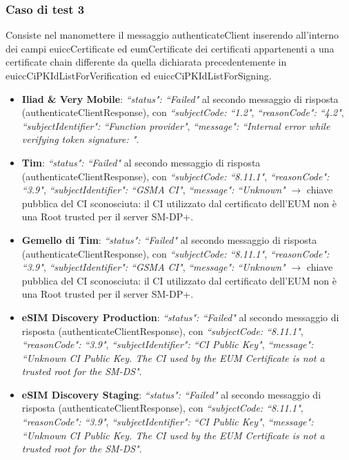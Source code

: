 \documentclass[10pt, oneside]{book}
\begin{document}
\subsubsection{Caso di test 3}
Consiste nel manomettere il messaggio authenticateClient inserendo all'interno dei campi euiccCertificate ed eumCertificate dei certificati appartenenti a una certificate chain differente da quella dichiarata precedentemente in euiccCiPKIdListForVerification ed euiccCiPKIdListForSigning.
\begin{itemize}
\item \textbf{Iliad \& Very Mobile}: \textit{``status": ``Failed"} al secondo messaggio di risposta (authenticateClientResponse), con \textit{``subjectCode: ``1.2"}, \textit{``reasonCode": ``4.2"}, \textit{``subjectIdentifier": ``Function provider"}, \textit{``message": ``Internal error while verifying token signature: "}.
\item \textbf{Tim}: \textit{``status": ``Failed"} al secondo messaggio di risposta (authenticateClientResponse), con \textit{``subjectCode: ``8.11.1"}, \textit{``reasonCode": ``3.9"}, \textit{``subjectIdentifier": ``GSMA CI"}, \textit{``message": ``Unknown"} $\rightarrow$ chiave pubblica del CI sconosciuta: il CI utilizzato dal certificato dell'EUM non è una Root trusted per il server SM-DP+.
\item \textbf{Gemello di Tim}: \textit{``status": ``Failed"} al secondo messaggio di risposta (authenticateClientResponse), con \textit{``subjectCode: ``8.11.1"}, \textit{``reasonCode": ``3.9"}, \textit{``subjectIdentifier": ``GSMA CI"}, \textit{``message": ``Unknown"} $\rightarrow$ chiave pubblica del CI sconosciuta: il CI utilizzato dal certificato dell'EUM non è una Root trusted per il server SM-DP+.
\item \textbf{eSIM Discovery Production}: \textit{``status": ``Failed"} al secondo messaggio di risposta (authenticateClientResponse), con \textit{``subjectCode: ``8.11.1"}, \textit{``reasonCode": ``3.9"}, \textit{``subjectIdentifier": ``CI Public Key"}, \textit{``message": ``Unknown CI Public Key. The CI used by the EUM Certificate is not a trusted root for the SM-DS"}.
\item \textbf{eSIM Discovery Staging}: \textit{``status": ``Failed"} al secondo messaggio di risposta (authenticateClientResponse), con \textit{``subjectCode: ``8.11.1"}, \textit{``reasonCode": ``3.9"}, \textit{``subjectIdentifier": ``CI Public Key"}, \textit{``message": ``Unknown CI Public Key. The CI used by the EUM Certificate is not a trusted root for the SM-DS"}.

\end{itemize}
\end{document}
